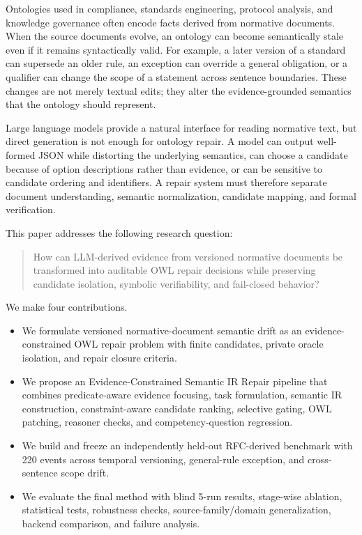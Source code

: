 \documentclass[11pt]{article}
\begin{document}
Ontologies used in compliance, standards engineering, protocol analysis, and knowledge governance often encode facts derived from normative documents. When the source documents evolve, an ontology can become semantically stale even if it remains syntactically valid. For example, a later version of a standard can supersede an older rule, an exception can override a general obligation, or a qualifier can change the scope of a statement across sentence boundaries. These changes are not merely textual edits; they alter the evidence-grounded semantics that the ontology should represent.

Large language models provide a natural interface for reading normative text, but direct generation is not enough for ontology repair. A model can output well-formed JSON while distorting the underlying semantics, can choose a candidate because of option descriptions rather than evidence, or can be sensitive to candidate ordering and identifiers. A repair system must therefore separate document understanding, semantic normalization, candidate mapping, and formal verification.

This paper addresses the following research question:

\begin{quote}
How can LLM-derived evidence from versioned normative documents be transformed into auditable OWL repair decisions while preserving candidate isolation, symbolic verifiability, and fail-closed behavior?
\end{quote}

We make four contributions.

\begin{itemize}
    \item We formulate versioned normative-document semantic drift as an evidence-constrained OWL repair problem with finite candidates, private oracle isolation, and repair closure criteria.
    \item We propose an Evidence-Constrained Semantic IR Repair pipeline that combines predicate-aware evidence focusing, task formulation, semantic IR construction, constraint-aware candidate ranking, selective gating, OWL patching, reasoner checks, and competency-question regression.
    \item We build and freeze an independently held-out RFC-derived benchmark with 220 events across temporal versioning, general-rule exception, and cross-sentence scope drift.
    \item We evaluate the final method with blind 5-run results, stage-wise ablation, statistical tests, robustness checks, source-family/domain generalization, backend comparison, and failure analysis.
\end{itemize}
\end{document}
